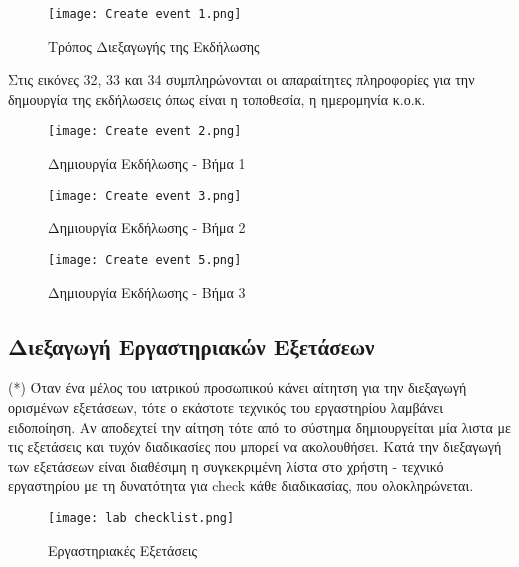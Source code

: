 \documentclass{article}
\begin{document}
\vspace{0.3cm}

\begin{figure}[!htb]
\centering
\texttt{[image: Create event 1.png]} 
\caption{\label{fig: event1} Τρόπος Διεξαγωγής της Εκδήλωσης}
\end{figure}

\newpage

\par Στις εικόνες 32, 33 και 34 συμπληρώνονται οι απαραίτητες πληροφορίες για την δημουργία της εκδήλωσεις όπως είναι η τοποθεσία, η ημερομηνία κ.ο.κ.

\begin{figure}[!htb]
\centering
\texttt{[image: Create event 2.png]} 
\caption{\label{fig: event2} Δημιουργία Εκδήλωσης - Βήμα 1}
\end{figure}

\vspace{0.3cm}

\begin{figure}[!htb]
\centering
\texttt{[image: Create event 3.png]} 
\caption{\label{fig: event3} Δημιουργία Εκδήλωσης - Βήμα 2}
\end{figure}

\vspace{0.3cm}

\begin{figure}[!htb]
\centering
\texttt{[image: Create event 5.png]} 
\caption{\label{fig: event4} Δημιουργία Εκδήλωσης - Βήμα 3}
\end{figure}

\subsection{Διεξαγωγή Εργαστηριακών Εξετάσεων}

(*) Όταν ένα μέλος του ιατρικού προσωπικού κάνει αίτητση για την διεξαγωγή ορισμένων εξετάσεων, τότε ο εκάστοτε τεχνικός του εργαστηρίου λαμβάνει ειδοποίηση. Αν αποδεχτεί την αίτηση τότε από το σύστημα δημιουργείται μία λιστα με τις εξετάσεις και τυχόν διαδικασίες που μπορεί να ακολουθήσει. Κατά την διεξαγωγή των εξετάσεων είναι διαθέσιμη η συγκεκριμένη λίστα στο χρήστη - τεχνικό εργαστηρίου με τη δυνατότητα για check κάθε διαδικασίας, που ολοκληρώνεται.

\begin{figure}[!htb]
\centering
\texttt{[image: lab checklist.png]}
\caption{\label{fig:lab checklist} Εργαστηριακές Εξετάσεις}
\end{figure}
\end{document}
